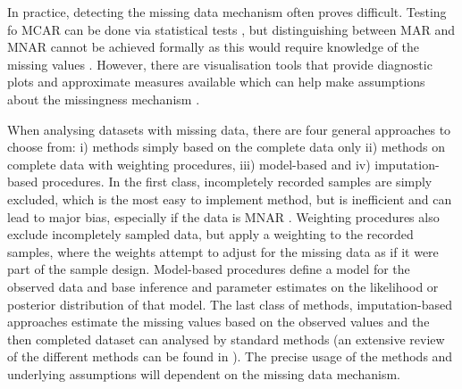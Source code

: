 In practice, detecting the missing data mechanism often proves difficult. Testing fo MCAR can be done via statistical tests \citep{Little1988}, but distinguishing between MAR and MNAR cannot be achieved formally as this would require knowledge of the missing values \citep{Little2002,vanBuuren2011}. However, there are visualisation tools that provide diagnostic plots and approximate measures available which can help make assumptions about the missingness mechanism \citep{Templ2012,Garson2015}. 

When analysing datasets with missing data, there are four general approaches to choose from:  i) methods simply based on the complete data only ii) methods on complete data with weighting procedures, iii) model-based and iv) imputation-based procedures. In the first class, incompletely recorded samples are simply excluded, which is the most easy to implement method, but is inefficient and can lead to major bias, especially if the data is MNAR \citep{Little2002}. Weighting procedures also exclude incompletely sampled data, but apply a weighting to the recorded samples, where the weights attempt to adjust for the missing data as if it were part of the sample design. Model-based procedures define a model for the observed data and base inference and parameter estimates on the likelihood or posterior distribution of that model. The last class of methods, imputation-based approaches estimate the missing values based on the observed values and the then completed dataset can analysed by standard methods (an extensive review of the different methods can be found in \citep{Rubin2002}). The precise usage of the methods and underlying assumptions will dependent on the missing data mechanism. 

